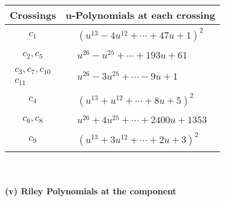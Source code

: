 \documentclass[1p]{elsarticle_modified}
\theoremstyle{definition}
\begin{document}
\begin{tabular}{m{50pt}|m{274pt}}
Crossings & \hspace{64pt}u-Polynomials at each crossing \\
\hline $$\begin{aligned}c_{1}\end{aligned}$$&$\begin{aligned}
&(u^{13}-4 u^{12}+\cdots+47 u+1)^{2}
\end{aligned}$\\
\hline $$\begin{aligned}c_{2},c_{5}\end{aligned}$$&$\begin{aligned}
&u^{26}- u^{25}+\cdots+193 u+61
\end{aligned}$\\
\hline $$\begin{aligned}c_{3},c_{7},c_{10}\\c_{11}\end{aligned}$$&$\begin{aligned}
&u^{26}-3 u^{25}+\cdots-9 u+1
\end{aligned}$\\
\hline $$\begin{aligned}c_{4}\end{aligned}$$&$\begin{aligned}
&(u^{13}+u^{12}+\cdots+8 u+5)^{2}
\end{aligned}$\\
\hline $$\begin{aligned}c_{6},c_{8}\end{aligned}$$&$\begin{aligned}
&u^{26}+4 u^{25}+\cdots+2400 u+1353
\end{aligned}$\\
\hline $$\begin{aligned}c_{9}\end{aligned}$$&$\begin{aligned}
&(u^{13}+3 u^{12}+\cdots+2 u+3)^{2}
\end{aligned}$\\
\hline
\end{tabular}\\~\\
\newpage\renewcommand{\arraystretch}{1}
\flushleft \textbf{(v) Riley Polynomials at the component}\newline \\
\end{document}
